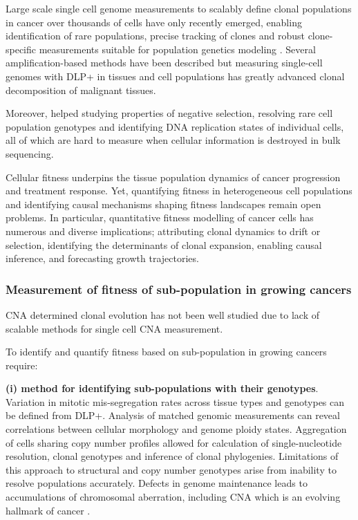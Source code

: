 Large scale single cell genome measurements to scalably define clonal populations in cancer over thousands of cells have only recently emerged, enabling identification of rare populations, precise tracking of clones and robust clone-specific measurements suitable for population genetics modeling  \cite{laks2019clonal,zahn2017scalable}. Several amplification-based methods have been described \cite{navin2011tumour,zong2012genome, hou2012single,ni2013reproducible} but measuring single-cell genomes with \ac{DLP+} in tissues and cell populations has greatly advanced clonal decomposition of malignant tissues. 

Moreover, helped studying properties of negative selection, resolving rare cell population genotypes and identifying DNA replication states of individual cells, all of which are hard to measure when cellular information is destroyed in bulk sequencing. 

Cellular fitness underpins the tissue population dynamics of cancer progression and treatment response. Yet, quantifying fitness in heterogeneous cell populations and identifying causal mechanisms shaping fitness landscapes remain open problems. In particular, quantitative fitness modelling of cancer cells has numerous and diverse implications; attributing clonal dynamics to drift or selection, identifying the determinants of clonal expansion, enabling causal inference, and forecasting growth trajectories. 

\subsubsection{Measurement of fitness of sub-population in growing cancers}

CNA determined clonal evolution has not been well studied due to lack of scalable methods for single cell CNA measurement.

To identify and quantify fitness based on sub-population in growing cancers require: 

\textbf{(i) method for identifying sub-populations with their genotypes}.
Variation in mitotic mis-segregation rates across tissue types and genotypes can be defined from DLP+. Analysis of matched genomic  measurements can reveal correlations between cellular morphology and genome ploidy states. Aggregation of cells sharing copy number profiles allowed for calculation of single-nucleotide resolution, clonal genotypes and inference of clonal phylogenies.
Limitations of this approach to structural and copy number genotypes arise from inability to resolve populations accurately. Defects in genome maintenance leads to accumulations of chromosomal aberration, including \ac{CNA} which is an evolving hallmark of cancer \cite{negrini2010genomic}. 


